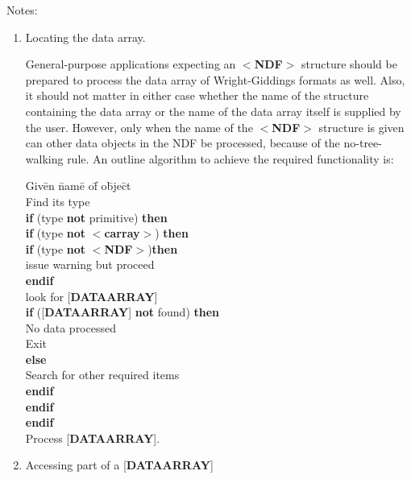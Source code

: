 \documentclass[twoside,11pt]{article}
\renewcommand{\_}{\texttt{\symbol{95}}}
\begin{document}
\goodbreak
Notes:
\begin{enumerate}
\item Locating the data array.

General-purpose applications expecting an $<${\bf NDF}$>$ structure should
be prepared to process
the data array of Wright-Giddings formats as well.  Also, it should not
matter in either case whether the name of the structure containing the
data array or the name of the data array itself is supplied by the user.
However, only when the name of the $<${\bf NDF}$>$ structure is given can
other data objects in the NDF be processed, because of the no-tree-walking
rule. An outline algorithm to achieve the required functionality is:

\begin{tabbing}
Giv\=en \=nam\=e o\=f o\=bje\=ct\\
Find its type\\
{\bf if} (type {\bf not} primitive) {\bf then}\+ \\
   {\bf if} (type {\bf not} $<${\bf c\_array}$>$) {\bf then}\+ \\
      {\bf if} (type {\bf not} $<${\bf NDF}$>$){\bf then}\+ \\
         issue warning but proceed\- \\
      {\bf endif} \\
      look for {[}{\bf DATA\_ARRAY}{]} \\
      {\bf if} ({[}{\bf DATA\_ARRAY}{]} {\bf not} found) {\bf then}\+ \\
         No data processed \\
         Exit\- \\
      {\bf else}\+ \\
         Search for other required items\- \\
      {\bf endif}\- \\
   {\bf endif}\- \\
{\bf endif} \\
Process {[}{\bf DATA\_ARRAY}{]}.
\end{tabbing}

\item Accessing part of a {[}{\bf DATA\_ARRAY}{]}


\end{enumerate}
\end{document}
